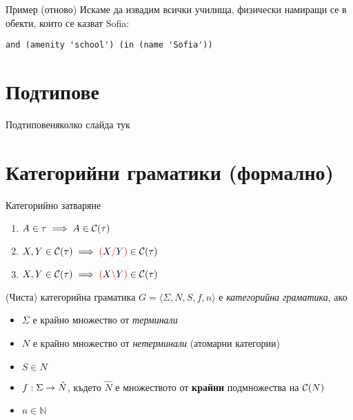 \documentclass[9pt]{beamer}
\begin{document}
  \begin{frame}[fragile]{Пример (отново)}
    Искаме да извадим всички училища, физически намиращи се в обекти,
    които се казват Sofia:
    \begin{lstwrap}\begin{lstlisting}
and (amenity 'school') (in (name 'Sofia'))
    \end{lstlisting}\end{lstwrap}
  \end{frame}

  \section{Подтипове}
  \begin{frame}{Подтипове}няколко слайда тук\end{frame}

  \section{Категорийни граматики (формално)}
  \begin{frame}{Категорийно затваряне}
    \begin{enumerate}
        \item \label{itm:atomic} $A \in \tau \implies A \in \mathcal{C}( \tau )$
        \item \label{itm:right}  $X, Y \in \mathcal{C}( \tau ) \implies \textcolor{red}{(} X \textcolor{red}{/} Y \textcolor{red}{)} \in \mathcal{C}( \tau )$
        \item \label{itm:left}   $X, Y \in \mathcal{C}( \tau ) \implies \textcolor{red}{(} X \textcolor{red}{\backslash} Y \textcolor{red}{)} \in \mathcal{C}( \tau )$
    \end{enumerate}
  \end{frame}

  \begin{frame}{(Чиста) категорийна граматика}
    $ G = \langle \Sigma, N, S, f, n \rangle $ е \emph{категорийна граматика}, ако
    \begin{itemize}
        \item $ \Sigma $ е крайно множество от \emph{терминали}
        \item $ N $ е крайно множество от \emph{нетерминали} (атомарни категории)
        \item $ S \in N $
        \item $ f : \Sigma \rightarrow \hat{N} $, където $\hat{N}$ е множеството от
            \textbf{крайни} подмножества на $\mathcal{C}( N )$
        \item $ n \in \mathbb{N} $
    \end{itemize}
  \end{frame}
\end{document}
